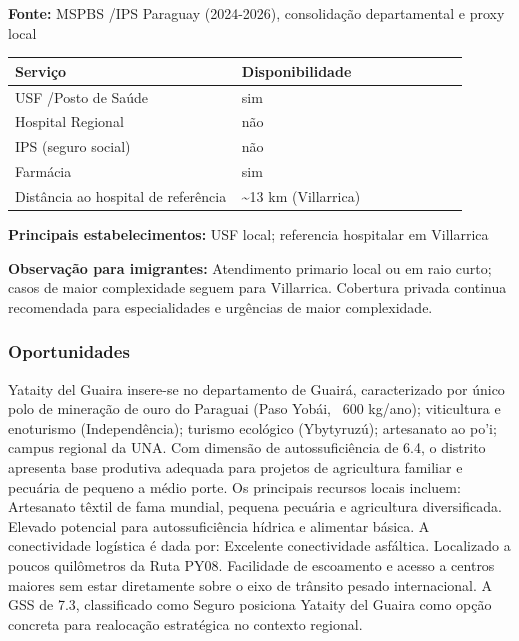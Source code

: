 \textbf{Fonte:} MSPBS /\allowbreak  IPS Paraguay (2024-2026), consolidação
departamental e proxy local

{\def\LTcaptype{none} %
\begin{longtable}{@{}>{\raggedright\arraybackslash}p{0.45\linewidth} >{\raggedright\arraybackslash}p{0.45\linewidth}@{}}
\toprule\noalign{}
Serviço & Disponibilidade \\
\midrule\noalign{}
\endhead
\bottomrule\noalign{}
\endlastfoot
USF /\allowbreak  Posto de Saúde & sim \\
Hospital Regional & não \\
IPS (seguro social) & não \\
Farmácia & sim \\
Distância ao hospital de referência & \textasciitilde13 km
(Villarrica) \\
\end{longtable}
}

\textbf{Principais estabelecimentos:} USF local; referencia hospitalar
em Villarrica

\textbf{Observação para imigrantes:} Atendimento primario local ou em
raio curto; casos de maior complexidade seguem para Villarrica.
Cobertura privada continua recomendada para especialidades e urgências
de maior complexidade.

\subsubsection*{Oportunidades}\label{oport-yataity-del-guaira-0418}
Yataity del Guaira insere-se no departamento de Guairá, caracterizado por único polo de mineração de ouro do Paraguai (Paso Yobái, ~600 kg/ano); viticultura e enoturismo (Independência); turismo ecológico (Ybytyruzú); artesanato ao po'i; campus regional da UNA. Com dimensão de autossuficiência de 6.4, o distrito apresenta base produtiva adequada para projetos de agricultura familiar e pecuária de pequeno a médio porte. Os principais recursos locais incluem: Artesanato têxtil de fama mundial, pequena pecuária e agricultura diversificada. Elevado potencial para autossuficiência hídrica e alimentar básica. A conectividade logística é dada por: Excelente conectividade asfáltica. Localizado a poucos quilômetros da Ruta PY08. Facilidade de escoamento e acesso a centros maiores sem estar diretamente sobre o eixo de trânsito pesado internacional. A GSS de 7.3, classificado como Seguro posiciona Yataity del Guaira como opção concreta para realocação estratégica no contexto regional.

